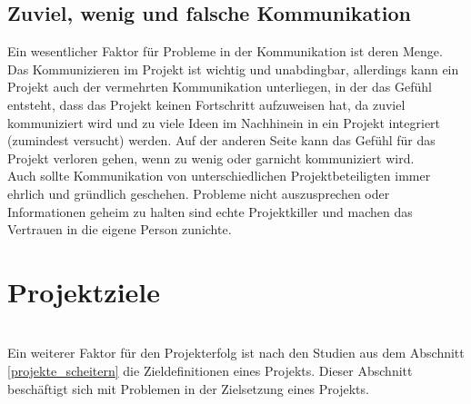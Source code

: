 \documentclass[12pt]{scrartcl}
\begin{document}
\subsection{Zuviel, wenig und falsche Kommunikation}
Ein wesentlicher Faktor für Probleme in der Kommunikation ist deren Menge. Das Kommunizieren im Projekt ist wichtig und unabdingbar, allerdings kann ein Projekt auch der vermehrten Kommunikation unterliegen, in der das Gefühl entsteht, dass das Projekt keinen Fortschritt aufzuweisen hat, da zuviel kommuniziert wird und zu viele Ideen im Nachhinein in ein Projekt integriert (zumindest versucht) werden. Auf der anderen Seite kann das Gefühl für das Projekt verloren gehen, wenn zu wenig oder garnicht kommuniziert wird.\\ Auch sollte Kommunikation von unterschiedlichen Projektbeteiligten immer ehrlich und gründlich geschehen. Probleme nicht auszusprechen oder Informationen geheim zu halten sind echte Projektkiller und machen das Vertrauen in die eigene Person zunichte.\\


\pagebreak
\section{Projektziele}
\ \\
Ein weiterer Faktor für den Projekterfolg ist nach den Studien aus dem Abschnitt \ref{projekte_scheitern} die Zieldefinitionen eines Projekts. Dieser Abschnitt beschäftigt sich mit Problemen in der Zielsetzung eines Projekts. 
\end{document}
